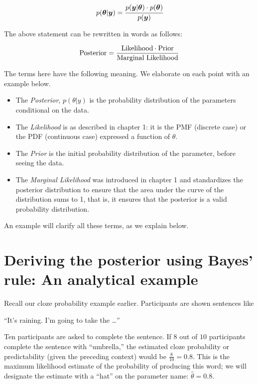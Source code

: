 \documentclass[12pt,]{krantz}
\begin{document}
\begin{equation}
p(\boldsymbol{\theta}|\boldsymbol{y}) = \cfrac{ p(\boldsymbol{y}|\boldsymbol{\theta}) \cdot p(\boldsymbol{\theta}) }{p(\boldsymbol{y})}
\label{eq:bayes}
\end{equation}

The above statement can be rewritten in words as follows:

\begin{equation}
\hbox{Posterior} = \frac{\hbox{Likelihood} \cdot \hbox{Prior}}{\hbox{Marginal Likelihood}}
\end{equation}

The terms here have the following meaning. We elaborate on each point with an example below.

\begin{itemize}
\item
  The \emph{Posterior}, \(p(\theta|y)\) is the probability distribution of the parameters conditional on the data.
\item
  The \emph{Likelihood} is as described in chapter 1: it is the PMF (discrete case) or the PDF (continuous case) expressed a function of \(\theta\).
\item
  The \emph{Prior} is the initial probability distribution of the parameter, before seeing the data.
\item
  The \emph{Marginal Likelihood} was introduced in chapter 1 and standardizes the posterior distribution to ensure that the area under the curve of the distribution sums to 1, that is, it ensures that the posterior is a valid probability distribution.
\end{itemize}

An example will clarify all these terms, as we explain below.

\hypertarget{sec:analytical}{%
\section{Deriving the posterior using Bayes' rule: An analytical example}\label{sec:analytical}}

Recall our cloze probability example earlier. Participants are shown sentences like

``It's raining. I'm going to take the \ldots{}''

Ten participants are asked to complete the sentence.
If \(8\) out of \(10\) participants complete the sentence with ``umbrella,'' the estimated cloze probability or predictability (given the preceding context) would be \(\frac{8}{10}=0.8\). This is the maximum likelihood estimate of the probability of producing this word; we will designate the estimate with a ``hat'' on the parameter name: \(\hat \theta=0.8\).
\end{document}

